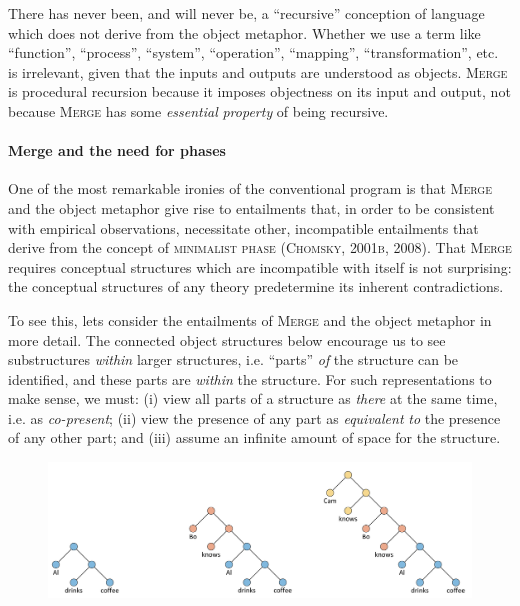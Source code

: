   There has never been, and will never be, a “recursive” conception of language which does not derive from the object metaphor. Whether we use a term like “function”, “process”, “system”, “operation”, “mapping”, “transformation”, etc. is irrelevant, given that the inputs and outputs are understood as objects. \textsc{Merge} is procedural recursion because it imposes objectness on its input and output, not because \textsc{Merge} has some \textit{essential} \textit{property} of being recursive.

\paragraph{Merge and the need for phases}

One of the most remarkable ironies of the conventional program is that \textsc{Merge} and the object metaphor give rise to entailments that, in order to be consistent with empirical observations, necessitate other, incompatible entailments that derive from the concept of \textsc{minimalist} \textsc{phase} (\textsc{Chomsky,} \textsc{2001b,} \textsc{2008)}. That \textsc{Merge} requires conceptual structures which are incompatible with itself is not surprising: the conceptual structures of any theory predetermine its inherent contradictions.

  To see this, lets consider the entailments of \textsc{Merge} and the object metaphor in more detail. The connected object structures below encourage us to see substructures \textit{within} larger structures, i.e. “parts” \textit{of} the structure can be identified, and these parts are \textit{within} the structure. For such representations to make sense, we must: (i) view all parts of a structure as \textit{there} at the same time, i.e. as \textit{co-present}; (ii) view the presence of any part as \textit{equivalent} \textit{to} the presence of any other part; and (iii) assume an infinite amount of space for the structure.

  
\begin{figure}
\includegraphics[width=\textwidth]{figures/Tilsen-img110.png}
\caption{\missingcaption}
\label{fig:}
\end{figure}
 

